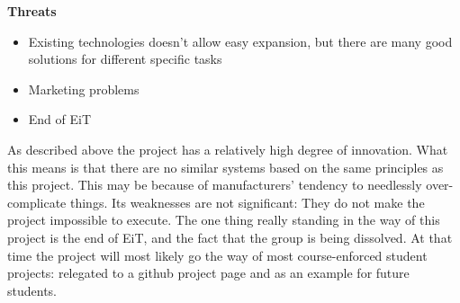\textbf{\Large Threats}
\begin{itemize}
	 \item Existing technologies doesn't allow easy expansion, but there are many good solutions for different specific tasks
	 \item Marketing problems 
     \item End of EiT
\end{itemize}

As described above the project has a relatively high degree of innovation. 
What this means is that there are no similar systems based on the same principles as this project.
This may be because of manufacturers' tendency to needlessly over-complicate things.
Its weaknesses are not significant: They do not make the project impossible to execute.
The one thing really standing in the way of this project is the end of EiT, and the fact that the group is being dissolved.
At that time the project will most likely go the way of most course-enforced student projects: relegated to a github project page and as an example for future students.
